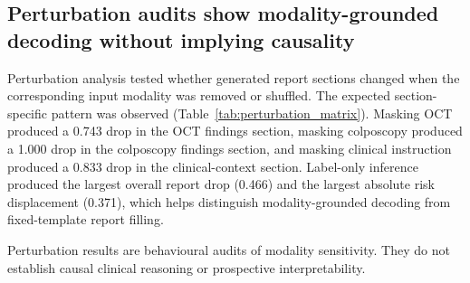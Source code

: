 \FloatBarrier

\subsection{Perturbation audits show modality-grounded decoding without implying causality}
\label{subsec:perturbation_results}

Perturbation analysis tested whether generated report sections changed when the corresponding input modality was removed or shuffled. The expected section-specific pattern was observed (Table~\ref{tab:perturbation_matrix}). Masking OCT produced a 0.743 drop in the OCT findings section, masking colposcopy produced a 1.000 drop in the colposcopy findings section, and masking clinical instruction produced a 0.833 drop in the clinical-context section. Label-only inference produced the largest overall report drop (0.466) and the largest absolute risk displacement (0.371), which helps distinguish modality-grounded decoding from fixed-template report filling.

\begin{table}[!htbp]
  \centering
  \caption{Perturbation sensitivity matrix. Drops are relative to normal decoding.}
  \label{tab:perturbation_matrix}
  \scriptsize
  \begin{threeparttable}
  \begin{tablenotes}[flushleft]
    \footnotesize
    \item Perturbation results are behavioural audits of modality sensitivity. They do not establish causal clinical reasoning or prospective interpretability.
  \end{tablenotes}
  \end{threeparttable}
\end{table}

